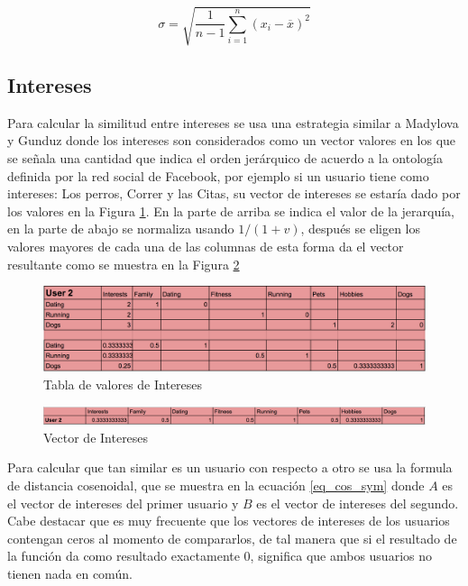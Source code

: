 \begin{equation} \label{eq_nivel}
    \sigma = \sqrt{\frac{1}{n-1} \sum_{i=1}^n (x_i - \overline{x})^2}
\end{equation}

\subsection{Intereses}

Para calcular la similitud entre intereses se usa una estrategia similar a Madylova y Gunduz \cite{taxonomy_semantic_similarity} donde los intereses son considerados como un vector valores en los que se señala una cantidad que indica el orden jerárquico de acuerdo a la ontología definida por la red social de Facebook, por ejemplo si un usuario tiene como intereses: Los perros, Correr y las Citas, su vector de intereses se estaría dado por los valores en la Figura \ref{fig:interests_table}. En la parte de arriba se indica el valor de la jerarquía, en la parte de abajo se normaliza usando \(1/(1+v)\), después se eligen los valores mayores de cada una de las columnas de esta forma da el vector resultante como se muestra en la Figura \ref{fig:interests_vector} \\

\begin{figure}
    \centering
    \includegraphics[width=150mm]{interests_table.png}
    \caption{Tabla de valores de Intereses}
    \label{fig:interests_table}
\end{figure}

\begin{figure}
    \centering
    \includegraphics[width=150mm]{interests_vector.png}
    \caption{Vector de Intereses}
    \label{fig:interests_vector}
\end{figure}

Para calcular que tan similar es un usuario con respecto a otro se usa la formula de distancia cosenoidal, que se muestra en la ecuación \ref{eq_cos_sym} donde \(A\) es el vector de intereses del primer usuario y \(B\) es el vector de intereses del segundo. Cabe destacar que es muy frecuente que los vectores de intereses de los usuarios contengan ceros al momento de compararlos, de tal manera que si el resultado de la función da como resultado exactamente 0, significa que ambos usuarios no tienen nada en común. 

